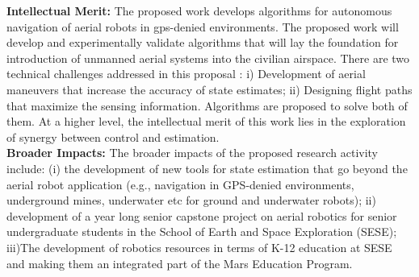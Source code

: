 \noindent \textbf{Intellectual Merit:}  The proposed work develops algorithms for autonomous navigation of aerial robots in gps-denied environments. The proposed work will develop and experimentally validate algorithms that will lay the foundation for introduction of unmanned aerial systems into the civilian airspace. There are two technical challenges addressed in this proposal : i) Development of aerial maneuvers that increase the accuracy of state estimates; ii) Designing flight paths that maximize the sensing information. Algorithms are proposed to solve both of them. At a higher level, the intellectual merit of this work lies in the exploration of synergy between control and estimation.\\
\noindent \textbf{Broader Impacts:} The broader impacts of the proposed research activity include: (i) the development of new tools for state estimation that go beyond the aerial robot application (e.g., navigation in GPS-denied environments, underground mines, underwater etc  for ground and underwater robots);  ii) development of a year long senior capstone project on aerial robotics for senior undergraduate students in the School of Earth and Space Exploration (SESE); iii)The development of robotics resources in terms of K-12 education at SESE and making them an integrated part of the Mars Education Program. 